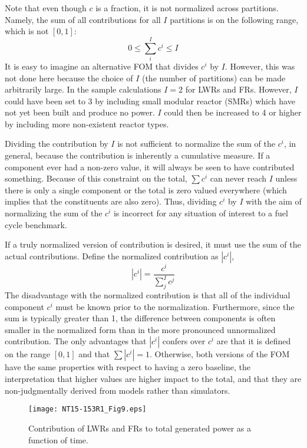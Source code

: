 \documentclass{ntmanuscript}
\begin{document}
Note that even though $c$ is a fraction, it is not normalized across
partitions. Namely, the sum of all contributions for all $I$ partitions
is on the following range, which is not $[0, 1]$:
\begin{equation}
\label{sum-c-range}
0 \le \sum_i^I c^i \le I
\end{equation}
It is easy to imagine an alternative FOM that divides $c^i$ by $I$. However,
this was not done here because the choice of $I$ (the number of partitions)
can be made arbitrarily large.  In the sample calculations $I=2$ for LWRs and
FRs.  However, $I$ could have been set to 3 by including small modular reactor
(SMRs) which have not yet been built and produce no power.  $I$ could then be
increased to 4 or higher by including more non-existent reactor types.

Dividing the contribution by $I$ is not sufficient to
normalize the sum of the $c^i$, in general, because the
contribution is inherently a cumulative measure. If a component ever had a
non-zero value, it will always be seen to have contributed something.
Because of this constraint on the total, $\sum c^i$ can never
reach $I$ unless there is only a single component or the
total is zero valued everywhere (which implies that the constituents are also
zero). Thus, dividing $c^i$ by $I$ with the aim of normalizing the
sum of the $c^i$ is incorrect for any situation of interest to a fuel
cycle benchmark.

If a truly normalized version of contribution is desired, it must
use the sum of the actual contributions. Define the normalized contribution
as $|c^i|$,
\begin{equation}
\label{norm-ci}
\left|c^i\right| = \frac{c^i}{\sum_j^I c^j}
\end{equation}
The disadvantage with the normalized contribution is that all of the
individual component $c^i$ must be known prior to the normalization.
Furthermore, since the sum is typically greater than 1, the difference
between components is often smaller in the normalized form than in the
more pronounced unnormalized contribution.
The only advantages that $|c^i|$ confers over $c^i$ are that it is defined on
the range $[0,1]$ and that $\sum |c^i| = 1$. Otherwise, both versions of the FOM
have the same properties with respect to having a zero baseline, the
interpretation that higher values are higher impact to the total, and that they
are non-judgmentally derived from models rather than simulators.

\begin{figure}[htb]
\centering
\texttt{[image: NT15-153R1\_Fig9.eps]}
\caption{Contribution of LWRs and FRs to total generated power as a
function of time.}
\label{c-of-t}
\end{figure}
\end{document}
